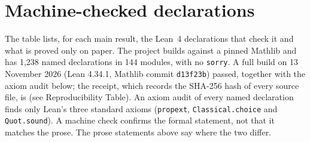 \section{Machine-checked declarations}\label{app:verification}

The table lists, for each main result, the Lean~4 declarations that check it and what is proved only on paper. The project builds against a pinned Mathlib and has 1,238 named declarations in 144 modules, with no \texttt{sorry}. A full build on 13 November 2026 (Lean 4.34.1, Mathlib commit \texttt{d13f23b}) passed, together with the axiom audit below; the receipt, which records the SHA-256 hash of every source file, is (see Reproducibility Table). An axiom audit of every named declaration finds only Lean's three standard axioms (\texttt{propext}, \texttt{Classical.choice} and \texttt{Quot.sound}). A machine check confirms the formal statement, not that it matches the prose. The prose statements above say where the two differ.

